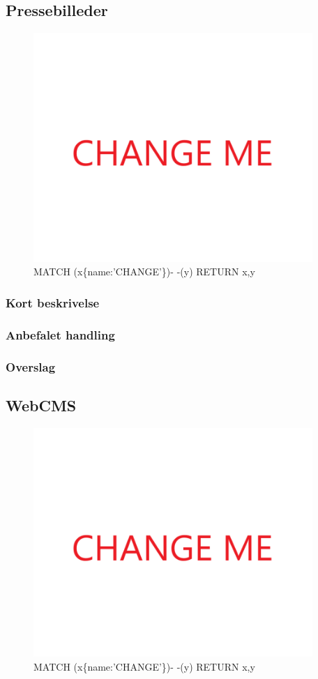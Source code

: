 \documentclass{article}
\begin{document}
\subsection{Pressebilleder}
\begin{figure}[h]
\includegraphics[width=300pt]{CHANGE.PNG}
\caption{MATCH (x\{name:'CHANGE'\})- -(y) RETURN x,y}
\end{figure}
\subsubsection{Kort beskrivelse}
\subsubsection{Anbefalet handling}
\subsubsection{Overslag}
\subsection{WebCMS}
\begin{figure}[h]
\includegraphics[width=300pt]{CHANGE.PNG}
\caption{MATCH (x\{name:'CHANGE'\})- -(y) RETURN x,y}
\end{figure}
\end{document}

